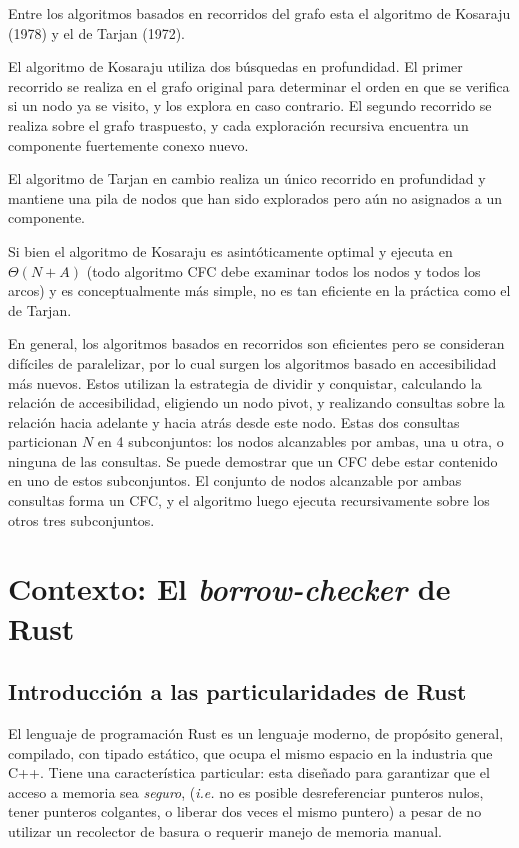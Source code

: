 \documentclass[12pt, a4paper]{article}
\begin{document}
Entre los algoritmos basados en recorridos del grafo esta el algoritmo de Kosaraju (1978) y el de Tarjan (1972).

El algoritmo de Kosaraju utiliza dos búsquedas en profundidad.
El primer recorrido se realiza en el grafo original para determinar el orden en que se verifica si un nodo ya se visito, y los explora en caso contrario.
El segundo recorrido se realiza sobre el grafo traspuesto, y cada exploración recursiva encuentra un componente fuertemente conexo nuevo.

El algoritmo de Tarjan en cambio realiza un único recorrido en profundidad y mantiene una pila de nodos que han sido explorados pero aún no asignados a un componente.

Si bien el algoritmo de Kosaraju es asintóticamente optimal y ejecuta en $\Theta(N+A)$ (todo algoritmo CFC debe examinar todos los nodos y todos los arcos) y es conceptualmente más simple, no es tan eficiente en la práctica como el de Tarjan.

En general, los algoritmos basados en recorridos son eficientes pero se consideran difíciles de paralelizar, por lo cual surgen los algoritmos basado en accesibilidad más nuevos.
Estos utilizan la estrategia de dividir y conquistar, calculando la relación de accesibilidad, eligiendo un nodo pivot, y realizando consultas sobre la relación hacia adelante y hacia atrás desde este nodo.
Estas dos consultas particionan $N$ en 4 subconjuntos: los nodos alcanzables por ambas, una u otra, o ninguna de las consultas.
Se puede demostrar que un CFC debe estar contenido en uno de estos subconjuntos.
El conjunto de nodos alcanzable por ambas consultas forma un CFC, y el algoritmo luego ejecuta recursivamente sobre los otros tres subconjuntos.

\section{Contexto: El \textit{borrow-checker} de Rust}

\subsection{Introducción a las particularidades de Rust}

El lenguaje de programación Rust es un lenguaje moderno, de propósito general, compilado, con tipado estático, que ocupa el mismo espacio en la industria que C++.
Tiene una característica particular: esta diseñado para garantizar que el acceso a memoria sea \textit{seguro}, (\textit{i.e.} no es posible desreferenciar punteros nulos, tener punteros colgantes, o liberar dos veces el mismo puntero) a pesar de no utilizar un recolector de basura o requerir manejo de memoria manual.
\end{document}
